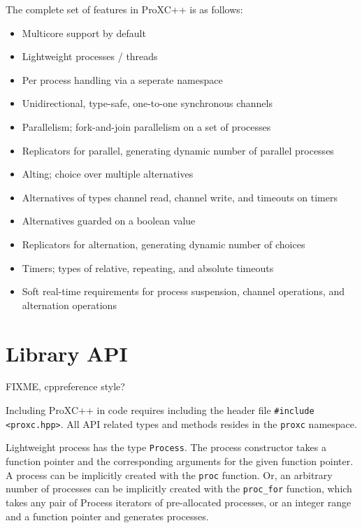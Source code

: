 The complete set of features in ProXC++ is as follows:

\begin{itemize}[topsep=0em,itemsep=-1em,partopsep=0.5em,parsep=1em]
    \item Multicore support by default
    \item Lightweight processes / threads
    \item Per process handling via a seperate namespace
    \item Unidirectional, type\hyp{}safe, one\hyp{}to\hyp{}one synchronous channels
    \item Parallelism; fork\hyp{}and\hyp{}join parallelism on a set of processes
    \item Replicators for parallel, generating dynamic number of parallel processes
    \item Alting; choice over multiple alternatives
    \item Alternatives of types channel read, channel write, and timeouts on timers
    \item Alternatives guarded on a boolean value
    \item Replicators for alternation, generating dynamic number of choices
    \item Timers; types of relative, repeating, and absolute timeouts
    \item Soft real\hyp{}time requirements for process suspension, channel operations, and alternation operations
\end{itemize}


\section{Library API}
\label{sec:library_api}

FIXME, cppreference style?

Including ProXC++ in code requires including the header file \lstinline[style={CustomC++}]|#include <proxc.hpp>|. All API related types and methods resides in the \lstinline[style={CustomC++}]|proxc| namespace. 

Lightweight process has the type \lstinline[style={CustomC++}]|Process|. The process constructor takes a function pointer and the corresponding arguments for the given function pointer. A process can be implicitly created with the \lstinline[style={CustomC++}]|proc| function. Or, an arbitrary number of processes can be implicitly created with the \lstinline[style={CustomC++}]|proc_for| function, which takes any pair of Process iterators of pre\hyp{}allocated processes, or an integer range and a function pointer and generates processes.

